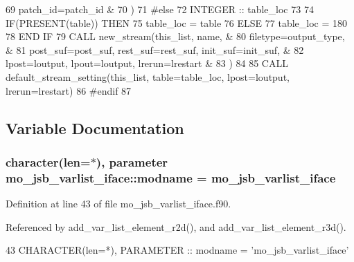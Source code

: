 \begin{DoxyCode}
69                       patch\_id=patch\_id                                        &
70                      )
71 \textcolor{preprocessor}{#else}
72 \textcolor{preprocessor}{}    \textcolor{keywordtype}{INTEGER} :: table\_loc
73 
74     \textcolor{keywordflow}{IF}(\textcolor{keyword}{PRESENT}(table)) \textcolor{keywordflow}{THEN}
75       table\_loc = table
76     \textcolor{keywordflow}{ELSE}
77       table\_loc = 180
78 \textcolor{keywordflow}{    END IF}
79     \textcolor{keyword}{CALL }new\_stream(this\_list, name,                                         &
80                     filetype=output\_type,                                    &
81                     post\_suf=post\_suf, rest\_suf=rest\_suf, init\_suf=init\_suf, &
82                     lpost=loutput, lpout=loutput, lrerun=lrestart            &
83                    )
84 
85     \textcolor{keyword}{CALL }default\_stream\_setting(this\_list, table=table\_loc, lpost=loutput, lrerun=lrestart)
86 \textcolor{preprocessor}{#endif}
87 \textcolor{preprocessor}{}
\end{DoxyCode}


\subsection{Variable Documentation}
\hypertarget{namespacemo__jsb__varlist__iface_a5a17e1c8f252488a0b648044116fcac7}{}
\subsubsection[{modname}]{\setlength{\rightskip}{0pt plus 5cm}character(len=$\ast$), parameter mo\+\_\+jsb\+\_\+varlist\+\_\+iface\+::modname = \textquotesingle{}mo\+\_\+jsb\+\_\+varlist\+\_\+iface\textquotesingle{}}\label{namespacemo__jsb__varlist__iface_a5a17e1c8f252488a0b648044116fcac7}


Definition at line 43 of file mo\+\_\+jsb\+\_\+varlist\+\_\+iface.\+f90.



Referenced by add\+\_\+var\+\_\+list\+\_\+element\+\_\+r2d(), and add\+\_\+var\+\_\+list\+\_\+element\+\_\+r3d().


\begin{DoxyCode}
43   \textcolor{keywordtype}{CHARACTER(len=*)}, \textcolor{keywordtype}{PARAMETER} :: modname = \textcolor{stringliteral}{'mo\_jsb\_varlist\_iface'}
\end{DoxyCode}
